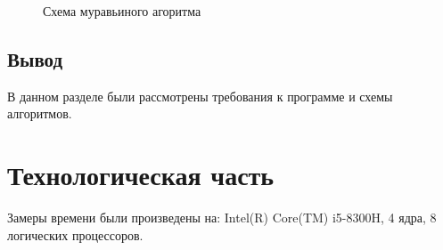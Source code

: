 \documentclass[12pt]{report}
\begin{document}
\begin{figure}[h]
        	\caption{Схема муравьиного агоритма}
        	\label{fig:ant}
\end{figure}
\newpage

\section*{Вывод}
В данном разделе были рассмотрены требования к программе и схемы алгоритмов.


 

\chapter{Технологическая часть}
Замеры времени были произведены на: Intel(R) Core(TM) i5-8300H, 4 ядра, 8 логических процессоров.
\end{document}
